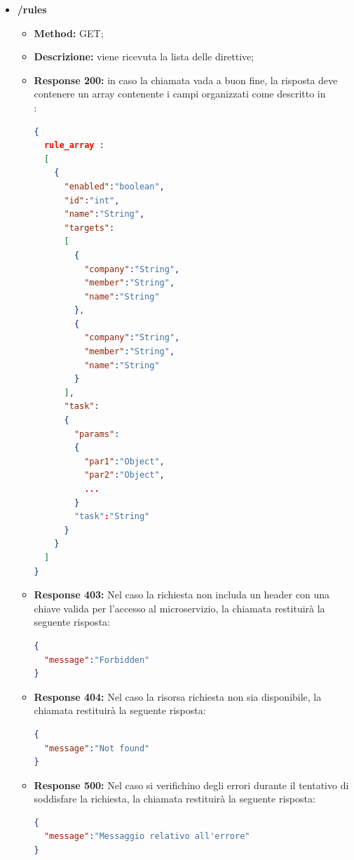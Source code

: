 \begin{itemize}

\item \textbf{/rules}\\

\begin{itemize}
\item \textbf{Method:} GET;
\item \textbf{Descrizione:} viene ricevuta la lista delle direttive;
\item \textbf{Response 200:} in caso la chiamata vada a buon fine, la risposta deve contenere un array contenente i campi organizzati come descritto in \\:
\begin{lstlisting}[language=json,firstnumber=1]
{
  rule_array :
  [
    {
      "enabled":"boolean",
      "id":"int",
      "name":"String",
      "targets":
      [
        {
          "company":"String",
          "member":"String",
          "name":"String"
        },
        {
          "company":"String",
          "member":"String",
          "name":"String"
        }
      ],
      "task":
      {
        "params":
        {
          "par1":"Object",
          "par2":"Object",
          ...
        }
        "task":"String"
      }
    }
  ]
}
\end{lstlisting}
\item \textbf{Response 403:} Nel caso la richiesta non includa un header  con una chiave valida per l'accesso al microservizio, la chiamata restituirà la seguente risposta:
\begin{lstlisting}[language=json,firstnumber=1]
{
  "message":"Forbidden"
}
\end{lstlisting}
\item \textbf{Response 404:} Nel caso la risorsa richiesta non sia disponibile, la chiamata restituirà la seguente risposta:
\begin{lstlisting}[language=json,firstnumber=1]
{
  "message":"Not found"
}
\end{lstlisting}
\item \textbf{Response 500:} Nel caso si verifichino degli errori durante il tentativo di soddisfare la richiesta, la chiamata restituirà la seguente risposta:
\begin{lstlisting}[language=json,firstnumber=1]
{
  "message":"Messaggio relativo all'errore"
}
\end{lstlisting}
\end{itemize}


\end{itemize}
